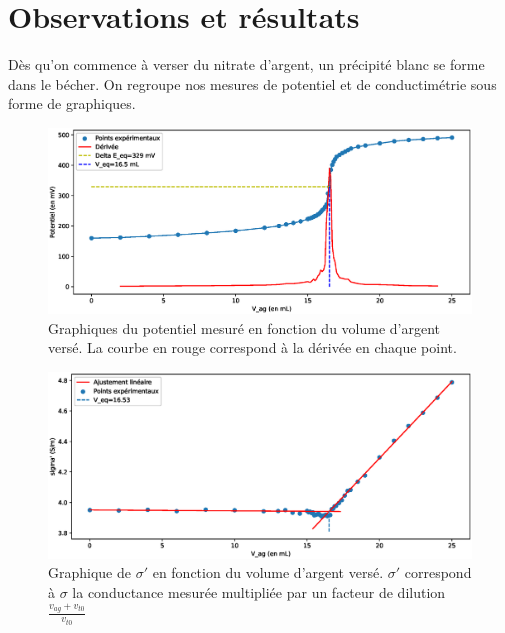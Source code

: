 \documentclass[12pt]{article}
\begin{document}
\section{Observations et résultats}

Dès qu'on commence à verser du nitrate d'argent, un précipité blanc se forme dans le bécher. 
On regroupe nos mesures de potentiel et de conductimétrie sous forme de graphiques.

\begin{figure}[p!]
    \begin{center}
        \includegraphics[scale=0.9,angle=90]{Potentiel.eps}
        \caption{Graphiques du potentiel mesuré en fonction du volume d'argent versé. La courbe en rouge correspond à la dérivée en chaque point.}
        \label{img2:Potentiometrie}
    \end{center}
\end{figure}

\begin{figure}[p!]
    \begin{center}
        \includegraphics[scale=0.9,angle=90]{Conducti.eps}
        \caption{Graphique de $\sigma '$ en fonction du volume d'argent versé. $\sigma '$ correspond à $\sigma$ la conductance mesurée multipliée par un facteur de dilution $\frac{v_{ag}+v_{t0}}{v_{t0}}$}
        \label{img3:Condu}
    \end{center}
\end{figure}
\end{document}
